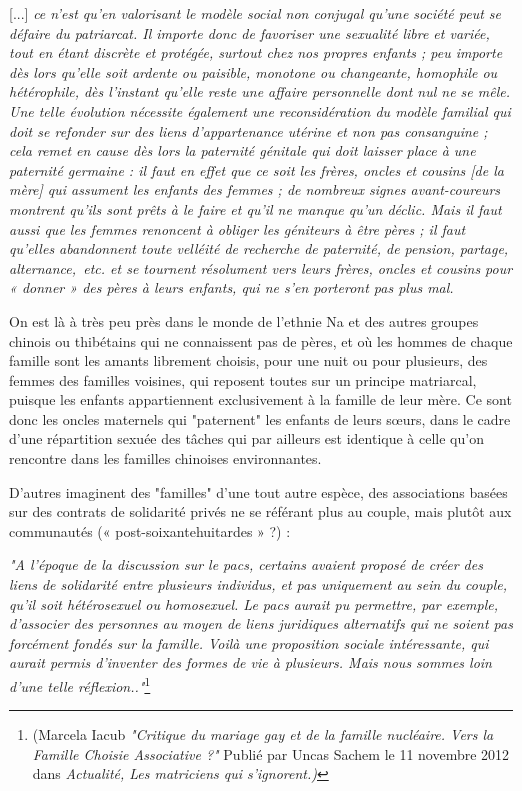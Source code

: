 \begin{displayquote}
{[...] \emph{ce n'est qu'en valorisant le modèle social non conjugal qu'une société peut se défaire du patriarcat. Il importe donc de favoriser une sexualité libre et variée, tout en étant discrète et protégée, surtout chez nos propres enfants ; peu importe dès lors qu'elle soit ardente ou paisible, monotone ou changeante, homophile ou hétérophile, dès l'instant qu'elle reste une affaire personnelle dont nul ne se mêle. Une telle évolution nécessite également une reconsidération du modèle familial qui doit se refonder sur des liens d'appartenance utérine et non pas consanguine ; cela remet en cause dès lors la paternité génitale qui doit laisser place à une paternité germaine : il faut en effet que ce soit les frères, oncles et cousins \emph{[de la mère]} qui assument les enfants des femmes ; de nombreux signes avant-coureurs montrent qu'ils sont prêts à le faire et qu'il ne manque qu'un déclic. Mais il faut aussi que les femmes renoncent à obliger les géniteurs à être pères ; il faut qu'elles abandonnent toute velléité de recherche de paternité, de pension, partage, alternance,~etc. et se tournent résolument vers leurs frères, oncles et cousins pour « donner » des pères à leurs enfants, qui ne s'en porteront pas plus mal.}}
\end{displayquote}

On est là à très peu près dans le monde de l'ethnie Na et des autres groupes chinois ou thibétains qui ne connaissent pas de pères, et où les hommes de chaque famille sont les amants librement choisis, pour une nuit ou pour plusieurs, des femmes des familles voisines, qui reposent toutes sur un principe matriarcal, puisque les enfants appartiennent exclusivement à la famille de leur mère. Ce sont donc les oncles maternels qui "paternent" les enfants de leurs sœurs, dans le cadre d'une répartition sexuée des tâches qui par ailleurs est identique à celle qu'on rencontre dans les familles chinoises environnantes.

D'autres imaginent des "familles" d'une tout autre espèce, des associations basées sur des contrats de solidarité privés ne se référant plus au couple, mais plutôt aux communautés (« post-soixantehuitardes » ?) : 

\begin{displayquote}
{\emph{"A l'époque de la discussion sur le pacs, certains avaient proposé de créer des liens de solidarité entre plusieurs individus, et pas uniquement au sein du couple, qu'il soit hétérosexuel ou homosexuel. Le pacs aurait pu permettre, par exemple, d'associer des personnes au moyen de liens juridiques alternatifs qui ne soient pas forcément fondés sur la famille. Voilà une proposition sociale intéressante, qui aurait permis d'inventer des formes de vie à plusieurs. Mais nous sommes loin d'une telle réflexion.."}\footnote{(Marcela Iacub \emph{"Critique du mariage gay et de la famille nucléaire. Vers la Famille Choisie Associative ?"} 
Publié par Uncas Sachem le 11 novembre 2012 dans \emph{Actualité, Les matriciens qui s'ignorent.)}}} 
 \end{displayquote}
 
